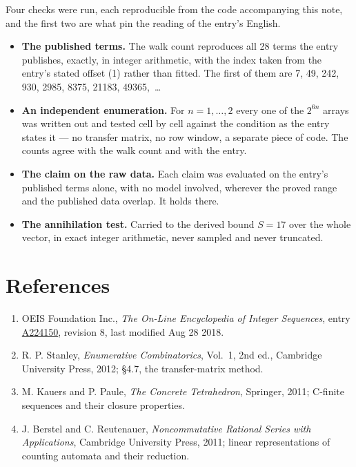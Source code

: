 \documentclass[11pt]{article}
\theoremstyle{definition}
\begin{document}
Four checks were run, each reproducible from the code accompanying this note, and the first two are what pin the reading of the entry's English.

\begin{itemize}

\item {\bfseries The published terms.} The walk count reproduces all 28 terms the entry publishes, exactly, in integer arithmetic, with the index taken from the entry's stated offset (1) rather than fitted. The first of them are 7, 49, 242, 930, 2985, 8375, 21183, 49365,~\dots

\item {\bfseries An independent enumeration.} For $n = 1,\dots,2$ every one of the $2^{6n}$ arrays was written out and tested cell by cell against the condition as the entry states it --- no transfer matrix, no row window, a separate piece of code. The counts agree with the walk count and with the entry.

\item {\bfseries The claim on the raw data.} Each claim was evaluated on the entry's published terms alone, with no model involved, wherever the proved range and the published data overlap. It holds there.

\item {\bfseries The annihilation test.} Carried to the derived bound $S = 17$ over the whole vector, in exact integer arithmetic, never sampled and never truncated.

\end{itemize}

\section{References}

\begin{enumerate}

\item OEIS Foundation Inc., \emph{The On-Line Encyclopedia of Integer Sequences}, entry \href{https://oeis.org/A224150}{A224150}, revision 8, last modified Aug 28 2018.

\item R. P. Stanley, \emph{Enumerative Combinatorics}, Vol.~1, 2nd ed., Cambridge University Press, 2012; \S4.7, the transfer-matrix method.

\item M. Kauers and P. Paule, \emph{The Concrete Tetrahedron}, Springer, 2011; C-finite sequences and their closure properties.

\item J. Berstel and C. Reutenauer, \emph{Noncommutative Rational Series with Applications}, Cambridge University Press, 2011; linear representations of counting automata and their reduction.

\end{enumerate}
\end{document}
